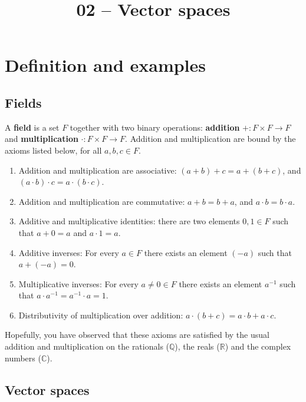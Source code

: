 \documentclass[a4paper,12pt]{amsart}
\title{02 -- Vector spaces}
\begin{document}

    \maketitle
    \tableofcontents

    \section{Definition and examples}

    \subsection{Fields}

    A \textbf{field} is a set $F$ together with two binary operations: \textbf{addition} $+: F \times F \to F$ and \textbf{multiplication} $\cdot: F \times F \to F$. Addition and multiplication are bound by the axioms listed below, for all $a, b, c \in F$.
    \begin{enumerate}
        \item Addition and multiplication are associative: $(a + b) + c = a + (b + c)$, and $(a \cdot b) \cdot c = a \cdot (b \cdot c)$.
        \item Addition and multiplication are commutative: $a + b = b + a$, and $a \cdot b = b \cdot a$.
        \item Additive and multiplicative identities: there are two elements $0, 1 \in F$ such that $a + 0 = a$ and $a \cdot 1 = a$.
        \item Additive inverses: For every $a \in F$ there exists an element $(-a)$ such that $a + (-a) = 0$.
        \item Multiplicative inverses: For every $a \neq 0 \in F$ there exists an element $a^{-1}$ such that $a \cdot a^{-1} = a^{-1} \cdot a = 1$.
        \item Distributivity of multiplication over addition: $a \cdot (b + c) = a \cdot b + a \cdot c$.
    \end{enumerate}

    Hopefully, you have observed that these axioms are satisfied by the usual addition and multiplication on the rationals ($\mathbb{Q}$), the reals ($\mathbb{R}$) and the complex numbers ($\mathbb{C}$).

    \subsection{Vector spaces}
\end{document}
